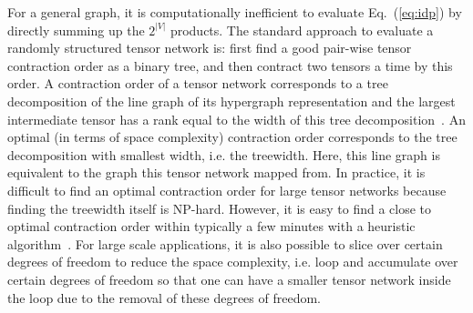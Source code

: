 \documentclass[onefignum, onetabnum]{siamart190516}
\newcommand{\<}{\langle}
\renewcommand{\>}{\rangle}
\newcommand{\Eq}[1]{Eq.~(\ref{#1})}
\newcommand{\blue}[1]{[{\bf  \color{blue}{JG: #1}}]}
\newcommand{\purple}[1]{[{\bf  \color{purple}{MC: #1}}]}
\begin{document}
For a general graph, it is computationally inefficient to evaluate \Eq{eq:idp} by directly summing up the $2^{|V|}$ products. %
The standard approach to evaluate a randomly structured tensor network is: first find a good pair-wise tensor contraction order as a binary tree, and then contract two tensors a time by this order.
A contraction order of a tensor network corresponds to a tree decomposition of the line graph of its hypergraph representation and the largest intermediate tensor has a rank equal to the width of this tree decomposition~\cite{Markov2008}.
An optimal (in terms of space complexity) contraction order corresponds to the tree decomposition with smallest width, i.e. the treewidth.
Here, this line graph is equivalent to the graph this tensor network mapped from. 
In practice, it is difficult to find an optimal contraction order for large tensor networks because finding the treewidth itself is NP-hard.
However, it is easy to find a close to optimal contraction order within typically a few minutes with a heuristic algorithm~\cite{Kourtis2019,Kalachev2021}.
For large scale applications, it is also possible to slice over certain degrees of freedom to reduce the space complexity, i.e.
loop and accumulate over certain degrees of freedom so that one can have a smaller tensor network inside the loop due to the removal of these degrees of freedom.
\end{document}
